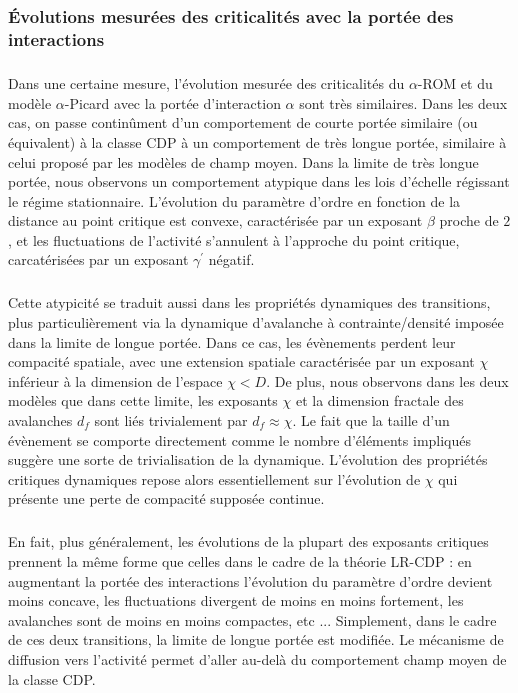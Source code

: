 \subsubsection{Évolutions mesurées des criticalités avec la portée des interactions}

\subparagraph{}Dans une certaine mesure, l'évolution mesurée des criticalités du $\alpha$-ROM et du modèle $\alpha$-Picard avec la portée d'interaction $\alpha$ sont très similaires. Dans les deux cas, on passe continûment d'un comportement de courte portée similaire (ou équivalent) à la classe CDP à un comportement de très longue portée, similaire à celui proposé par les modèles de champ moyen. Dans la limite de très longue portée, nous observons un comportement atypique dans les lois d'échelle régissant le régime stationnaire. L'évolution du paramètre d'ordre en fonction de la distance au point critique est convexe, caractérisée par un exposant $\beta$ proche de $2$, et les fluctuations de l'activité s'annulent à l'approche du point critique, carcatérisées par un exposant $\gamma^\prime$ négatif.

\subparagraph{}Cette atypicité se traduit aussi dans les propriétés dynamiques des transitions, plus particulièrement via la dynamique d'avalanche à contrainte/densité imposée dans la limite de longue portée. Dans ce cas, les évènements perdent leur compacité spatiale, avec une extension spatiale caractérisée par un exposant $\chi$ inférieur à la dimension de l'espace $\chi < D$. De plus, nous observons dans les deux modèles que dans cette limite, les exposants $\chi$ et la dimension fractale des avalanches $d_f$ sont liés trivialement par $d_f\approx \chi$. Le fait que la taille d'un évènement se comporte directement comme le nombre d'éléments impliqués suggère une sorte de trivialisation de la dynamique. L'évolution des propriétés critiques dynamiques repose alors essentiellement sur l'évolution de $\chi$ qui présente une perte de compacité supposée continue.

\subparagraph{}En fait, plus généralement, les évolutions de la plupart des exposants critiques prennent la même forme que celles dans le cadre de la théorie LR-CDP : en augmentant la portée des interactions l'évolution du paramètre d'ordre devient moins concave, les fluctuations divergent de moins en moins fortement, les avalanches sont de moins en moins compactes, etc ... Simplement, dans le cadre de ces deux transitions, la limite de longue portée est modifiée. Le mécanisme de diffusion vers l'activité permet d'aller au-delà du comportement champ moyen de la classe CDP.

